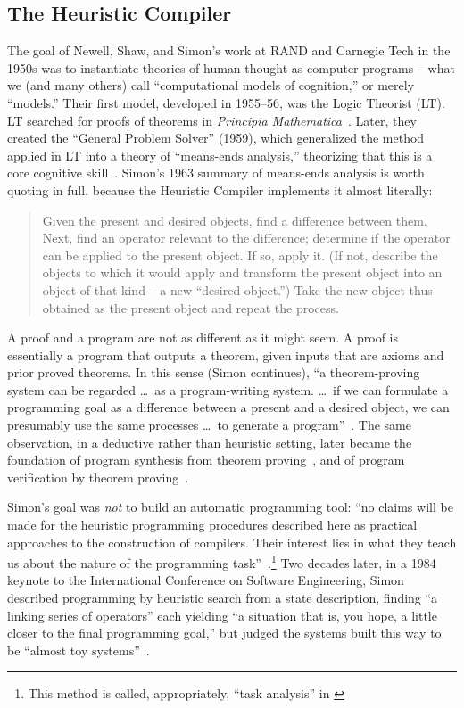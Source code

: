 \documentclass[11pt]{article}
\begin{document}
\subsection{The Heuristic Compiler}

The goal of Newell, Shaw, and Simon's work at RAND and Carnegie Tech
in the 1950s was to instantiate theories of human thought as computer
programs -- what we (and many others) call ``computational models of
cognition,'' or merely ``models.'' Their first model, developed in 1955--56, was
the Logic Theorist (LT). LT searched for proofs of theorems
in \textit{Principia
  Mathematica}~\cite{LT1957,moewsshrager2026}. Later, they created the
``General Problem Solver'' (1959), which generalized the method applied
in LT into a theory of ``means-ends analysis,'' theorizing that this
is a core cognitive skill~\cite{newell1959gps}. Simon's 1963 summary
of means-ends analysis is worth quoting in full, because the Heuristic
Compiler implements it almost literally:

\begin{quote}
Given the present and desired objects, find a difference between them.
Next, find an operator relevant to the difference; determine if the
operator can be applied to the present object. If so, apply it. (If
not, describe the objects to which it would apply and transform the
present object into an object of that kind -- a new ``desired
object.'') Take the new object thus obtained as the present object and
repeat the process.~\cite[p.~494]{simon1963jacm}
\end{quote}

A proof and a program are not as different as it might seem. A proof
is essentially a program that outputs a theorem, given inputs that are
axioms and prior proved theorems. In this sense (Simon continues), ``a
theorem-proving system can be regarded \ldots\ as a program-writing
system. \ldots\ if we can formulate a programming goal as a difference
between a present and a desired object, we can presumably use the same
processes \ldots\ to generate a
program''~\cite[p.~495]{simon1963jacm}. The same observation, in a
deductive rather than heuristic setting, later became the foundation
of program synthesis from theorem
proving~\cite{green1969,mannawaldinger1971}, and of program verification by
theorem proving~\cite{boyermoore1979}.

Simon's goal was \emph{not} to build an automatic programming tool:
``no claims will be made for the heuristic programming procedures
described here as practical approaches to the construction of
compilers. Their interest lies in what they teach us about the nature
of the programming task''~\cite[p.~493]{simon1963jacm}.\footnote{This
method is called, appropriately, ``task analysis'' in
\cite{newell1972hps}} Two decades later, in a 1984 keynote to the
International Conference on Software Engineering, Simon described
programming by heuristic search from a state description, finding ``a
linking series of operators'' each yielding ``a situation that is, you
hope, a little closer to the final programming goal,'' but judged the
systems built this way to be ``almost toy
systems''~\cite[p.~728]{simon1986}.
\end{document}

